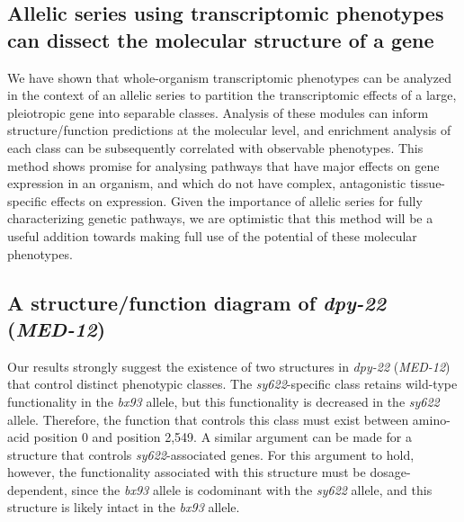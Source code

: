 \documentclass[10pt, twocolumn]{article}
\newcommand{\gene}[1]{\mbox{\emph{#1}}}
\newcommand{\dpy}{\gene{dpy-22} (\emph{MED-12})}
\begin{document}
\subsection*{Allelic series using transcriptomic phenotypes can dissect the
             molecular structure of a gene}
We have shown that whole-organism transcriptomic phenotypes can be analyzed in
the context of an allelic series to partition the transcriptomic effects of a
large, pleiotropic gene into separable classes. Analysis of these modules can
inform structure/function predictions at the molecular level, and enrichment
analysis of each class can be subsequently correlated with observable phenotypes.
This method shows promise for analysing pathways that have major effects on
gene expression in an organism, and which do not have complex, antagonistic
tissue-specific effects on expression. Given the importance of allelic series
for fully characterizing genetic pathways, we are optimistic that this method
will be a useful addition towards making full use of the potential of these
molecular phenotypes.

\subsection*{A structure/function diagram of \dpy{}}
Our results strongly suggest the existence of two structures in \dpy{} that
control distinct phenotypic classes. The \emph{sy622}-specific class retains
wild-type functionality in the \emph{bx93} allele, but this functionality is
decreased in the \emph{sy622} allele. Therefore, the function that controls this
class must exist between amino-acid position 0 and position 2,549. A similar
argument can be made for a structure that controls \emph{sy622}-associated
genes. For this argument to hold, however, the functionality associated with this
structure must be dosage-dependent, since the \emph{bx93} allele is codominant
with the \emph{sy622} allele, and this structure is likely intact in the
\emph{bx93} allele.
\end{document}
